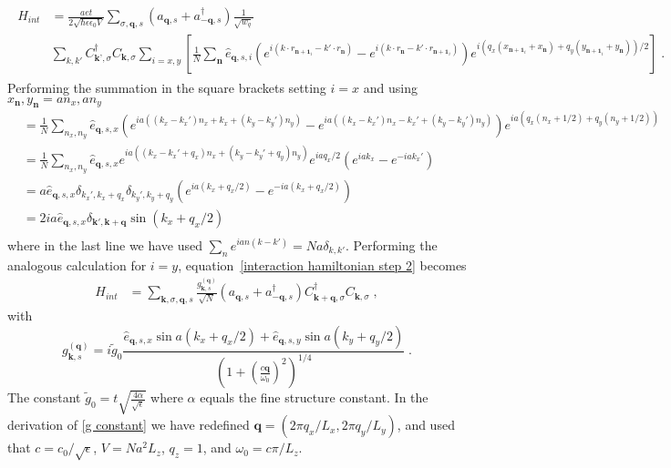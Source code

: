 \documentclass{article}
\begin{document}
\begin{align*}
    \begin{split}
    H_{int} &= \frac{aet}{2\sqrt{\hbar \epsilon \epsilon_0 V} } \sum_{\sigma,\textbf{q},s} \left(a_{\textbf{q},s} + a_{-\textbf{q}, s}^{\dagger}\right) \frac{1}{\sqrt{w_q}} \\ 
            & \sum_{k,k'}   C_{\textbf{k'},\sigma}^{\dagger} C_{\textbf{k},\sigma} \sum_{i=x,y} \left[\frac{1}{N}\sum_{\textbf{n}} \hat{e}_{\textbf{q},s,i} ( e^{i\left(k \cdot r_{\textbf{n}+\textbf{1}_i} - k' \cdot r_{\textbf{n}} \right)} - e^{i\left(k \cdot r_{\textbf{n}} - k' \cdot r_{\textbf{n}+\textbf{1}_i}\right)}) e^{i\left(q_x \left(x_{\textbf{n} + \textbf{1}_i} + x_{\textbf{n}} \right) + q_y \left(y_{\textbf{n} + \textbf{1}_i} + y_{\textbf{n}} \right)\right)/2}\right]\;.
    \end{split}
    \label{interaction hamiltonian step 2}
\end{align*}
Performing the summation in the square brackets setting $i = x$ and using $x_{\textbf{n}},y_{\textbf{n}} = a n_x, a n_y$
\begin{align*}
    [...] &= \frac{1}{N}\sum_{n_x, n_y} \hat{e}_{\textbf{q},s,x} ( e^{i a\left((k_x - k_x') n_x + k_x + (k_y - k_y') n_y \right)} -  e^{i a\left((k_x - k_x') n_x - k_x' + (k_y - k_y') n_y \right)}) e^{i a \left(q_x \left(n_x + 1/2\right) + q_y (n_y + 1/2)\right)}\\
          &= \frac{1}{N}\sum_{n_x, n_y} \hat{e}_{\textbf{q},s,x} e^{i a\left((k_x - k_x' + q_x) n_x + (k_y - k_y' + q_y) n_y \right)} e^{ia q_x / 2} ( e^{i a k_x } -  e^{-i a k_x' })\\
          &= a \hat{e}_{\textbf{q},s,x} \delta_{k_x',k_x + q_x} \delta_{k_y',k_y + q_y}  ( e^{i a (k_x + q_x /2) } -  e^{-i a (k_x + q_x/2)  })\\
          &= 2 i a \hat{e}_{\textbf{q},s,x} \delta_{\textbf{k}',\textbf{k} + \textbf{q}} \sin(k_x + q_x /2)\\
\end{align*}
where in the last line we have used $\sum_n e^{ian(k - k')} = N a \delta_{k,k'}$. Performing the analogous calculation for $i = y$, equation~\cref{interaction hamiltonian step 2} becomes
\begin{align}
    H_{int} &=  \sum_{\textbf{k},\sigma,\textbf{q},s} \frac{g_{\textbf{k},s}^{(\textbf{q})}}{\sqrt{N}} \left(a_{\textbf{q},s} + a_{-\textbf{q}, s}^{\dagger}\right) C_{\textbf{k} + \textbf{q},\sigma}^{\dagger} C_{\textbf{k},\sigma} \;,
\end{align}
with 
\begin{equation}
   g_{\textbf{k},s}^{(\textbf{q})} = i \tilde{g}_0 \frac{\hat{e}_{\textbf{q},s,x} \sin{a(k_x + q_x /2)} + \hat{e}_{\textbf{q},s,y} \sin{a(k_y + q_y /2)}}{\left(1 + \left(\frac{c\textbf{q}}{\omega_0}\right)^2\right)^{1/4}}\;.
   \label{g constant}
\end{equation}
The constant $\tilde{g}_0 = t\sqrt{\frac{4 \alpha}{\sqrt{\epsilon}}}$ where $\alpha$ equals the fine structure constant. In the derivation of \cref{g constant} we have redefined $\textbf{q} = (2\pi q_x / L_x, 2\pi q_y / L_y) $, and used that  $c = c_0 / \sqrt{\epsilon}$, $V = N a^2 L_z$, $q_z = 1$,  and $\omega_0 = c\pi / L_z$.
\end{document}
